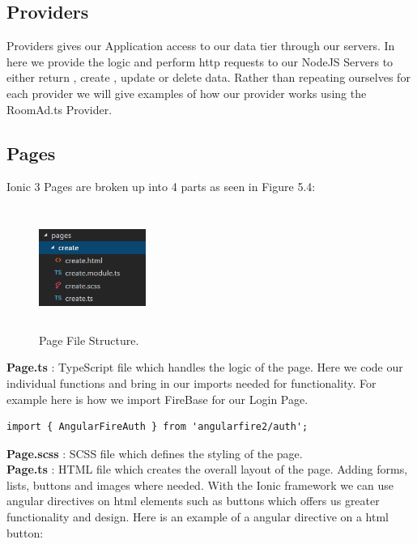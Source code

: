\subsection{Providers}

Providers gives our Application access to our data tier through our servers. In here we provide the logic and perform http requests to our NodeJS Servers to either return , create , update or delete data. Rather than repeating ourselves for each provider we will give examples of how our provider works using the RoomAd.ts Provider.

\subsection{Pages}

Ionic 3 Pages are broken up into 4 parts as seen in Figure 5.4:\\

\begin{figure}[h]
\centering
\includegraphics[width=3.5cm, height=4cm]{img/Pages}
\caption{Page File Structure.}
\end{figure}

\noindent \textbf{Page.ts} : TypeScript file which handles the logic of the page. Here we code our individual functions and bring in our imports needed for functionality. For example here is how we import FireBase for our Login Page. 
    
\begin{verbatim}
import { AngularFireAuth } from 'angularfire2/auth';
\end{verbatim}

\noindent \textbf{Page.scss} : SCSS file which defines the styling of the page.\\

\noindent \textbf{Page.ts} : HTML file which creates the overall layout of the page. Adding forms, lists, buttons and images where needed. With the Ionic framework we can use angular directives on html elements such as buttons which offers us greater functionality and design. Here is an example of a angular directive on a html button:

